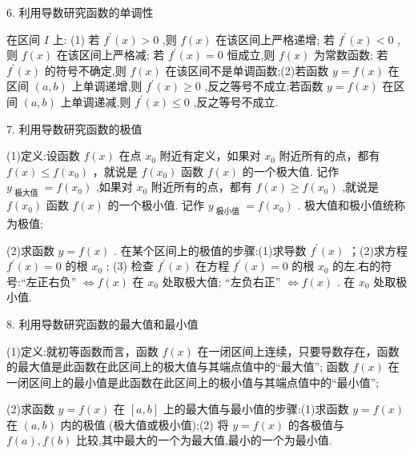 \documentclass[10pt]{article}
\begin{document}
6. 利用导数研究函数的单调性

在区间 \(I\) 上: (1) 若 \({f}^{\prime }\left( x\right)  > 0\) ,则 \(f\left( x\right)\) 在该区间上严格递增; 若 \({f}^{\prime }\left( x\right)  < 0\) ,则 \(f\left( x\right)\) 在该区间上严格减; 若 \({f}^{\prime }\left( x\right)  = 0\) 恒成立,则 \(f\left( x\right)\) 为常数函数; 若 \({f}^{\prime }\left( x\right)\) 的符号不确定,则 \(f\left( x\right)\) 在该区间不是单调函数;(2)若函数 \(y = f\left( x\right)\) 在区间 \(\left( {a,b}\right)\) 上单调递增,则 \({f}^{\prime }\left( x\right)  \geq  0\) ,反之等号不成立;若函数 \(y = f\left( x\right)\) 在区间 \(\left( {a,b}\right)\) 上单调递减,则 \({f}^{\prime }\left( x\right)  \leq  0\) ,反之等号不成立.

7. 利用导数研究函数的极值

(1)定义:设函数 \(f\left( x\right)\) 在点 \({x}_{0}\) 附近有定义，如果对 \({x}_{0}\) 附近所有的点，都有 \(f\left( x\right)  \leq  f\left( {x}_{0}\right)\) ，就说是 \(f\left( {x}_{0}\right)\) 函数 \(f\left( x\right)\) 的一个极大值. 记作 \({y}_{\text{ 极大值 }} = f\left( {x}_{0}\right)\) ,如果对 \({x}_{0}\) 附近所有的点，都有 \(f\left( x\right)  \geq  f\left( {x}_{0}\right)\) ,就说是 \(f\left( {x}_{0}\right)\) 函数 \(f\left( x\right)\) 的一个极小值. 记作 \({y}_{\text{ 极小值 }} = f\left( {x}_{0}\right)\) . 极大值和极小值统称为极值;

(2)求函数 \(y = f\left( x\right)\) . 在某个区间上的极值的步骤:(1)求导数 \({f}^{\prime }\left( x\right)\) ；(2)求方程 \({f}^{\prime }\left( x\right)  = 0\) 的根 \({x}_{0}\) ; (3) 检查 \({f}^{\prime }\left( x\right)\) 在方程 \({f}^{\prime }\left( x\right)  = 0\) 的根 \({x}_{0}\) 的左.右的符号:“左正右负” \(\Leftrightarrow  f\left( x\right)\) 在 \({x}_{0}\) 处取极大值; “左负右正” \(\Leftrightarrow  f\left( x\right)\) . 在 \({x}_{0}\) 处取极小值.

8. 利用导数研究函数的最大值和最小值

(1)定义:就初等函数而言，函数 \(f\left( x\right)\) 在一闭区间上连续，只要导数存在，函数的最大值是此函数在此区间上的极大值与其端点值中的“最大值”; 函数 \(f\left( x\right)\) 在一闭区间上的最小值是此函数在此区间上的极小值与其端点值中的“最小值”;

(2)求函数 \(y = f\left( x\right)\) 在 \(\left\lbrack  {a,b}\right\rbrack\) 上的最大值与最小值的步骤:(1)求函数 \(y = f\left( x\right)\) 在 \(\left( {a,b}\right)\) 内的极值 (极大值或极小值);(2) 将 \(y = f\left( x\right)\) 的各极值与 \(f\left( a\right) ,f\left( b\right)\) 比较,其中最大的一个为最大值,最小的一个为最小值.
\end{document}
